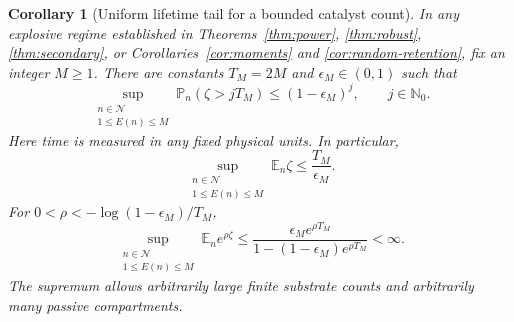 \documentclass[11pt,a4paper]{article}
\newtheorem{corollary}[theorem]{Corollary}
\theoremstyle{remark}\newtheorem{remark}[theorem]{Remark}
\newcommand{\Nzero}{\mathbb N_0}
\newcommand{\E}{\mathbb E}
\newcommand{\Prob}{\mathbb P}
\newcommand{\state}{\mathcal N}
\begin{document}
\begin{corollary}[Uniform lifetime tail for a bounded catalyst count]\label{cor:lifetime}
In any explosive regime established in Theorems~\ref{thm:power}, \ref{thm:robust}, \ref{thm:secondary}, or Corollaries~\ref{cor:moments} and \ref{cor:random-retention}, fix an integer $M\ge1$. There are constants $T_M=2M$ and $\epsilon_M\in(0,1)$ such that
\begin{equation}\label{eq:tail}
\sup_{\substack{n\in\state\\1\le E(n)\le M}}
\Prob_n(\zeta>jT_M)\le(1-\epsilon_M)^j,\qquad j\in\Nzero.
\end{equation}
Here time is measured in any fixed physical units. In particular,
\[
\sup_{\substack{n\in\state\\1\le E(n)\le M}}\E_n\zeta
\le\frac{T_M}{\epsilon_M}.
\]
For $0<\rho<-\log(1-\epsilon_M)/T_M$,
\begin{equation}\label{eq:exponential-moment}
\sup_{\substack{n\in\state\\1\le E(n)\le M}}\E_n e^{\rho\zeta}
\le\frac{\epsilon_M e^{\rho T_M}}
 {1-(1-\epsilon_M)e^{\rho T_M}}<\infty.
\end{equation}
The supremum allows arbitrarily large finite substrate counts and arbitrarily many passive compartments.
\end{corollary}
\end{document}
